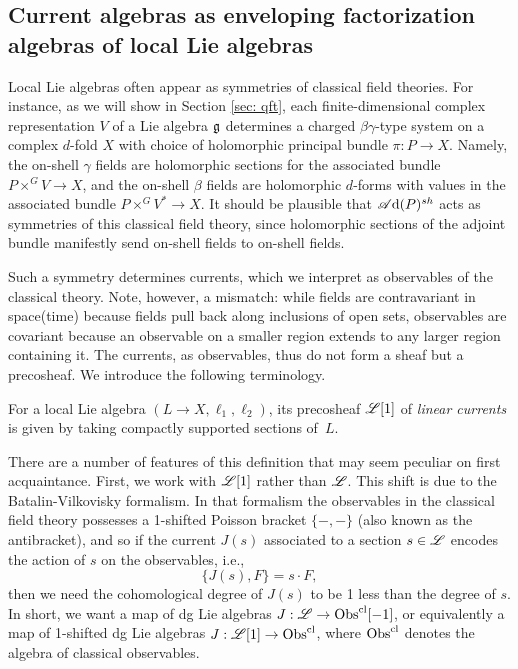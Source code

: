 \subsection{Current algebras as enveloping factorization algebras of local Lie algebras}

Local Lie algebras often appear as symmetries of classical field theories.
For instance, as we will show in Section \ref{sec: qft}, 
each finite-dimensional complex representation $V$ of a Lie algebra $\mathfrak g$
determines a charged $\beta\gamma$-type system on a complex $d$-fold $X$ with choice of holomorphic principal bundle $\pi: P \to X$.
Namely, the on-shell $\gamma$ fields are holomorphic sections for the associated bundle $P \times^G V \to X$, 
and the on-shell $\beta$ fields are holomorphic $d$-forms with values in the associated bundle $P \times^G V^* \to X$.
It should be plausible that $\mathscr A{\rm d}(P)^{sh}$ acts as symmetries of this classical field theory,
since holomorphic sections of the adjoint bundle manifestly send on-shell fields to on-shell fields.

Such a symmetry determines currents, which we interpret as observables of the classical theory.
Note, however, a mismatch: 
while fields are contravariant in space(time) because fields pull back along inclusions of open sets, 
observables are covariant because an observable on a smaller region extends to any larger region containing it.
The currents, as observables, thus do not form a sheaf but a precosheaf.
We introduce the following terminology.

\begin{dfn}
For a local Lie algebra $(L\to X, \ell_1,\ell_2)$, its precosheaf $\mathscr L[1]$ of {\em linear currents} is given by taking compactly supported sections of~$L$.
\end{dfn}

There are a number of features of this definition that may seem peculiar on first acquaintance.
First, we work with $\mathscr L[1]$ rather than $\mathscr L$.
This shift is due to the Batalin-Vilkovisky formalism. 
In that formalism the observables in the classical field theory possesses a 1-shifted Poisson bracket $\{-,-\}$ (also known as the antibracket), and so if the current $J(s)$ associated to a section $s \in \mathscr L$ encodes the action of $s$ on the observables, i.e.,
\[
\{J(s), F\} = s \cdot F,
\]
then we need the cohomological degree of $J(s)$ to be 1 less than the degree of $s$.
In short, we want a map of dg Lie algebras $J: \mathscr L \to {\rm Obs}^{\rm cl}[-1]$,
or equivalently a map of 1-shifted dg Lie algebras $J: \mathscr L[1] \to {\rm Obs}^{\rm cl}$,
where ${\rm Obs}^{\rm cl}$ denotes the algebra of classical observables.

